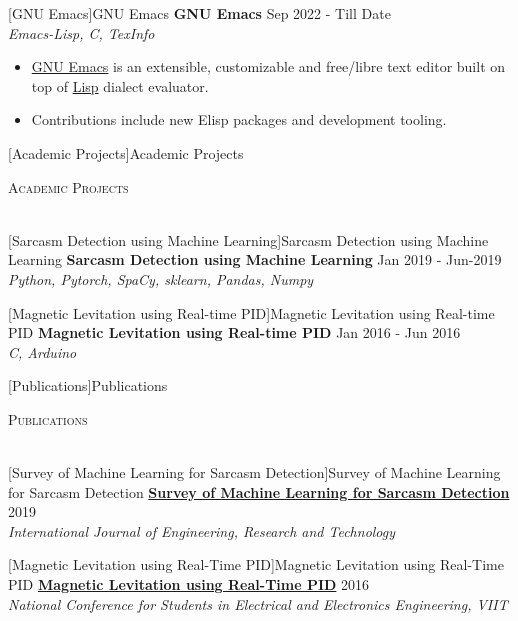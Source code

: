 \documentclass[a4paper]{article}
\newcommand{\lineunder} {
    \vspace*{-8pt} \\
    \hspace*{-18pt} \hrulefill \\
}
\newcommand{\header} [1] {
    {\hspace*{-18pt}\vspace*{6pt} \textsc{#1}}
    \vspace*{-6pt} \lineunder
}
\begin{document}
[GNU Emacs]{GNU Emacs}
{\textbf{GNU Emacs}} \hfill Sep 2022 - Till Date \\
\textit{Emacs-Lisp, C, TexInfo} \\
\begin{itemize}
	\item \href{https://www.gnu.org/software/emacs/}{GNU Emacs} is an extensible, customizable and free/libre text editor built on top of \href{https://en.wikipedia.org/wiki/Lisp_(programming_language)}{Lisp} dialect evaluator. \\
	\item Contributions include new Elisp packages and development tooling.\\
\end{itemize}

[Academic Projects]{Academic Projects}
\header{Academic Projects}
\vspace{1mm}

[Sarcasm Detection using Machine Learning]{Sarcasm Detection using Machine Learning}
{\textbf{Sarcasm Detection using Machine Learning}} \hfill Jan 2019 - Jun-2019\\
\textit{Python, Pytorch, SpaCy, sklearn, Pandas, Numpy} \\
\vspace{1mm}

[Magnetic Levitation using Real-time PID]{Magnetic Levitation using Real-time PID}
{\textbf{Magnetic Levitation using Real-time PID}} \hfill Jan 2016 - Jun 2016\\
\textit{C, Arduino} \\
\vspace*{2mm}

[Publications]{Publications}
\header{Publications}
\vspace{1mm}

[Survey of Machine Learning for Sarcasm Detection]{Survey of Machine Learning for Sarcasm Detection}
{\textbf{\href{https://www.ijert.org/survey-of-machine-learning-for-sarcasm-detection}{Survey of Machine Learning for Sarcasm Detection}}} \hfill 2019\\
\textit{International Journal of Engineering, Research and Technology} \\
\vspace*{2mm}

[Magnetic Levitation using Real-Time PID]{Magnetic Levitation using Real-Time PID}
{\textbf{\href{https://ijrat.org/downloads/Conference_Proceedings/ncseee2016/ncseee-15.pdf}{Magnetic Levitation using Real-Time PID}}} \hfill 2016\\
\textit{National Conference for Students in Electrical and Electronics Engineering, VIIT} \\
\vspace*{2mm}
\end{document}

